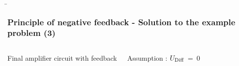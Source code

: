 \begin{frame}
{        \begin{block}{}
            
        \end{block}
    }	
   \b{\frametitle{Principle of negative feedback - Solution to the example problem (3)}
    \begin{columns}
            \begin{center}
                
                Final amplifier circuit with feedback
                \label{fig:Verschaltung des Verstärkers2}             
            \end{center}        
        Assumption : $U_{\textnormal{Diff}}$~=~0
        \end{columns} 
    }
 \end{frame}

